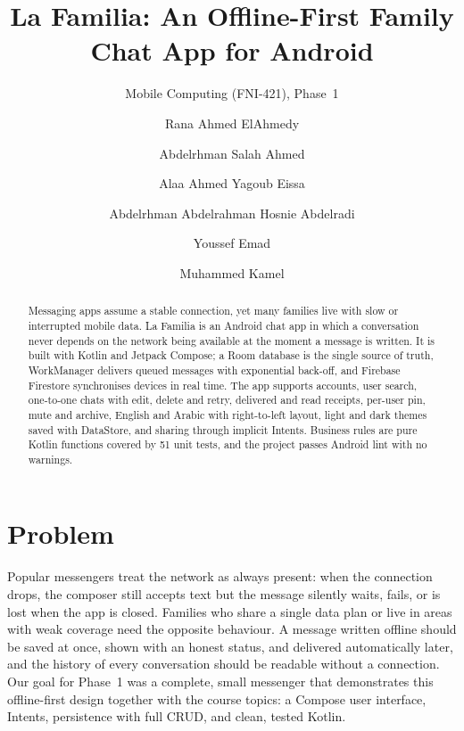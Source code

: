 \documentclass[sigconf,nonacm]{acmart}
\begin{document}
\title{La Familia: An Offline-First Family Chat App for Android}
\subtitle{Mobile Computing (FNI-421), Phase~1}

\author{Rana Ahmed ElAhmedy}
\author{Abdelrhman Salah Ahmed}
\author{Alaa Ahmed Yagoub Eissa}
\author{Abdelrhman Abdelrahman Hosnie Abdelradi}
\author{Youssef Emad}
\author{Muhammed Kamel}

\renewcommand{\shortauthors}{ElAhmedy et al.}

\begin{abstract}
Messaging apps assume a stable connection, yet many families live with slow or
interrupted mobile data. La Familia is an Android chat app in which a conversation
never depends on the network being available at the moment a message is written.
It is built with Kotlin and Jetpack Compose; a Room database is the single source of
truth, WorkManager delivers queued messages with exponential back-off, and Firebase
Firestore synchronises devices in real time. The app supports accounts, user search,
one-to-one chats with edit, delete and retry, delivered and read receipts,
per-user pin, mute and archive, English and Arabic with right-to-left layout, light and
dark themes saved with DataStore, and sharing through implicit Intents. Business rules
are pure Kotlin functions covered by 51 unit tests, and the project passes Android lint
with no warnings.
\end{abstract}


\maketitle

\section{Problem}
Popular messengers treat the network as always present: when the connection drops, the
composer still accepts text but the message silently waits, fails, or is lost when the
app is closed. Families who share a single data plan or live in areas with weak coverage
need the opposite behaviour. A message written offline should be saved at once, shown
with an honest status, and delivered automatically later, and the history of every
conversation should be readable without a connection. Our goal for Phase~1 was a
complete, small messenger that demonstrates this offline-first design together with the
course topics: a Compose user interface, Intents, persistence with full CRUD, and clean,
tested Kotlin.
\end{document}
